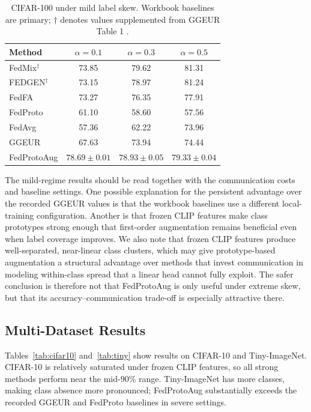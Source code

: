﻿\documentclass[conference]{IEEEtran}
\newcommand{\method}{FedProtoAug}
\newcommand{\clip}{CLIP}
\begin{document}
\begin{table}[t]
\centering
\caption{CIFAR-100 under mild label skew. Workbook baselines are primary; $\dagger$ denotes values supplemented from GGEUR Table 1 \cite{ma2025ggeur}.}
\label{tab:cifar100_mild}
\begin{tabular}{lccc}
\toprule
Method & $\alpha = 0.1$ & $\alpha = 0.3$ & $\alpha = 0.5$ \\
\midrule
FedMix$^\dagger$ & 73.85 & 79.62 & 81.31 \\
FEDGEN$^\dagger$ & 73.15 & 78.97 & 81.24 \\
FedFA & 73.27 & 76.35 & 77.91 \\
FedProto & 61.10 & 58.60 & 57.56 \\
FedAvg & 57.36 & 62.22 & 73.96 \\
GGEUR & 67.63 & 73.94 & 74.44 \\
\method{} & $78.69\pm0.01$ & $78.93\pm0.05$ & $79.33\pm0.04$ \\
\bottomrule
\end{tabular}
\end{table}

The mild-regime results should be read together with the communication costs and baseline settings. One possible explanation for the persistent advantage over the recorded GGEUR values is that the workbook baselines use a different local-training configuration. Another is that frozen \clip{} features make class prototypes strong enough that first-order augmentation remains beneficial even when label coverage improves. We also note that frozen \clip{} features produce well-separated, near-linear class clusters, which may give prototype-based augmentation a structural advantage over methods that invest communication in modeling within-class spread that a linear head cannot fully exploit. The safer conclusion is therefore not that \method{} is only useful under extreme skew, but that its accuracy--communication trade-off is especially attractive there.

\subsection{Multi-Dataset Results}
Tables~\ref{tab:cifar10} and~\ref{tab:tiny} show results on CIFAR-10 and Tiny-ImageNet. CIFAR-10 is relatively saturated under frozen \clip{} features, so all strong methods perform near the mid-90\% range. Tiny-ImageNet has more classes, making class absence more pronounced; \method{} substantially exceeds the recorded GGEUR and FedProto baselines in severe settings.
\end{document}
